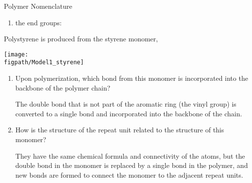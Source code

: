 \begin{activity}{Polymer Nomenclature}
\begin{ctqs}
\begin{enumerate}
				\begin{solution}[0.5in]\studentdisplay{
					~
				}\end{solution}
			
			\item the end groups:
			
				\begin{solution}[0.5in]\studentdisplay{
					~
				}\end{solution}
			
			
		\end{enumerate}
		
	\question Polystyrene is produced from the styrene monomer,
	
		\centerline{\texttt{[image: \\figpath/Model1\_styrene]}}
	
		\begin{enumerate}
			\item Upon polymerization, which bond from this monomer is incorporated into the backbone of the polymer chain?
			
				\begin{solution}[0.5in]
				
					The double bond that is not part of the aromatic ring (the vinyl group) is converted to a single bond and incorporated into the backbone of the chain.
					
				\end{solution}
				
			\item How is the structure of the repeat unit related to the structure of this monomer?
			
				\begin{solution}[0.5in]
				
					They have the same chemical formula and connectivity of the atoms, but the double bond in the monomer is replaced by a single bond in the polymer, and new bonds are formed to connect the monomer to the adjacent repeat units.
					
				\end{solution}
				

\end{enumerate}
\end{ctqs}
\end{activity}
